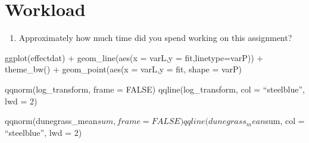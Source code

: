 \documentclass[
]{article}
\providecommand{\tightlist}{%
  \setlength{\itemsep}{0pt}\setlength{\parskip}{0pt}}
\begin{document}
\hypertarget{workload}{%
\section{Workload}\label{workload}}

\begin{enumerate}
\def\labelenumi{\arabic{enumi}.}
\setcounter{enumi}{9}
\tightlist
\item
  Approximately how much time did you spend working on this assignment?
\end{enumerate}

ggplot(effectdat) + geom\_line(aes(x = varL,y = fit,linetype=varP)) +
theme\_bw() + geom\_point(aes(x = varL,y = fit, shape = varP)

qqnorm(log\_transform, frame = FALSE) qqline(log\_transform, col =
``steelblue'', lwd = 2)

qqnorm(dunegrass\_mean\(sum, frame = FALSE) qqline(dunegrass_mean\)sum,
col = ``steelblue'', lwd = 2)
\end{document}
